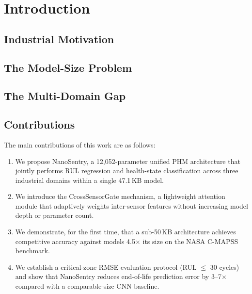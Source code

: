 \documentclass[AMA,Times1COL]{WileyNJDv5}
\begin{document}
\section{Introduction}\label{sec:intro}

\subsection{Industrial Motivation}\label{sec:intro:motivation}

\subsection{The Model-Size Problem}\label{sec:intro:size}

\subsection{The Multi-Domain Gap}\label{sec:intro:gap}

\subsection{Contributions}\label{sec:intro:contributions}
The main contributions of this work are as follows:
\begin{enumerate}
 \item We propose NanoSentry, a 12{,}052-parameter unified PHM architecture
 that jointly performs RUL regression and health-state classification across
 three industrial domains within a single 47.1\,KB model.
 \item We introduce the CrossSensorGate mechanism, a lightweight attention
 module that adaptively weights inter-sensor features without increasing
 model depth or parameter count.
 \item We demonstrate, for the first time, that a sub-50\,KB architecture
 achieves competitive accuracy against models 4.5$\times$ its size on the
 NASA C-MAPSS benchmark.
 \item We establish a critical-zone RMSE evaluation protocol (RUL $\leq$ 30
 cycles) and show that NanoSentry reduces end-of-life prediction error by
 3--7$\times$ compared with a comparable-size CNN baseline.
\end{enumerate}
\end{document}
